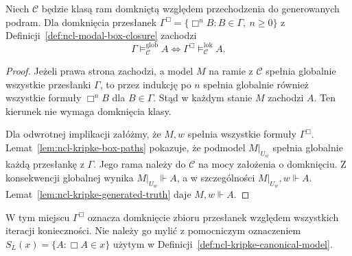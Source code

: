 \begin{twierdzenie}
\label{thm:ncl-kripke-global-local-reduction}
Niech $\mathcal C$ będzie klasą ram domkniętą
względem przechodzenia do generowanych podram.
Dla domknięcia przesłanek
$\Gamma^\Box=\{\Box^n B:B\in\Gamma,\ n\geq0\}$
z Definicji~\ref{def:ncl-modal-box-closure} zachodzi
\[
 \Gamma\models_{\mathcal C}^{\mathrm{glob}}A
 \iff\Gamma^\Box\models_{\mathcal C}^{\mathrm{lok}}A.
\]
\end{twierdzenie}
\begin{proof}
Jeżeli prawa strona zachodzi, a model $M$
na ramie z $\mathcal C$ spełnia globalnie
wszystkie przesłanki $\Gamma$, to przez
indukcję po $n$ spełnia globalnie również
wszystkie formuły $\Box^n B$ dla $B\in\Gamma$.
Stąd w każdym stanie $M$ zachodzi $A$.
Ten kierunek nie wymaga domknięcia klasy.

Dla odwrotnej implikacji załóżmy, że
$M,w$ spełnia wszystkie formuły $\Gamma^\Box$.
Lemat~\ref{lem:ncl-kripke-box-paths}
pokazuje, że podmodel $M|_{U_w}$ spełnia
globalnie każdą przesłankę z $\Gamma$.
Jego rama należy do $\mathcal C$
na mocy założenia o domknięciu.
Z konsekwencji globalnej wynika
$M|_{U_w}\Vdash A$, a w szczególności
$M|_{U_w},w\Vdash A$.
Lemat~\ref{lem:ncl-kripke-generated-truth}
daje $M,w\Vdash A$.
\end{proof}

W tym miejscu $\Gamma^\Box$ oznacza domknięcie
zbioru przesłanek względem wszystkich iteracji
konieczności. Nie należy go mylić z pomocniczym
oznaczeniem $S_L(x)=\{A:\Box A\in x\}$ użytym
w Definicji~\ref{def:ncl-kripke-canonical-model}.

